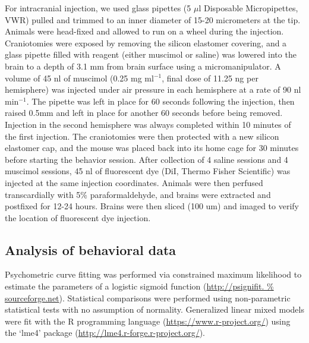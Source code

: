 For intracranial injection, we used glass pipettes (5 $\mu$l Disposable Micropipettes, VWR) pulled and trimmed to an inner diameter of 15-20 micrometers at the tip.
%
Animals were head-fixed and allowed to run on a wheel during the injection.
%
Craniotomies were exposed by removing the silicon elastomer covering, and a glass pipette filled with reagent (either muscimol or saline) was lowered into the brain to a depth of 3.1 mm from brain surface using a micromanipulator.
%
A volume of 45 nl of muscimol (0.25 mg ml$^{-1}$, final dose of 11.25 ng per hemisphere) was injected under air pressure in each hemisphere at a rate of 90 nl min$^{-1}$.  %
%
The pipette was left in place for 60 seconds following the injection, then raised 0.5mm and left in place for another 60 seconds before being removed.
%
Injection in the second hemisphere was always completed within 10 minutes of the first injection.
%
The craniotomies were then protected with a new silicon elastomer cap, and the mouse was placed back into its home cage for 30 minutes before starting the behavior session.
%
After collection of 4 saline sessions and 4 muscimol sessions, 45 nl of fluorescent dye (DiI, Thermo Fisher Scientific) was injected at the same injection coordinates.
%
Animals were then perfused transcardially with 5\% paraformaldehyde, and brains were extracted and postfixed for 12-24 hours.
%
Brains were then sliced (100 um) and imaged to verify the location of fluorescent dye injection.  

\subsection{Analysis of behavioral data}

Psychometric curve fitting was performed via constrained maximum likelihood to estimate the parameters of a logistic sigmoid function (\url{http://psignifit.
%
sourceforge.net}). Statistical comparisons were performed using non-parametric statistical tests with no assumption of normality. 
%
Generalized linear mixed models were fit with the R programming language (\url{https://www.r-project.org/}) using the `lme4' package (\url{http://lme4.r-forge.r-project.org/}).  %



